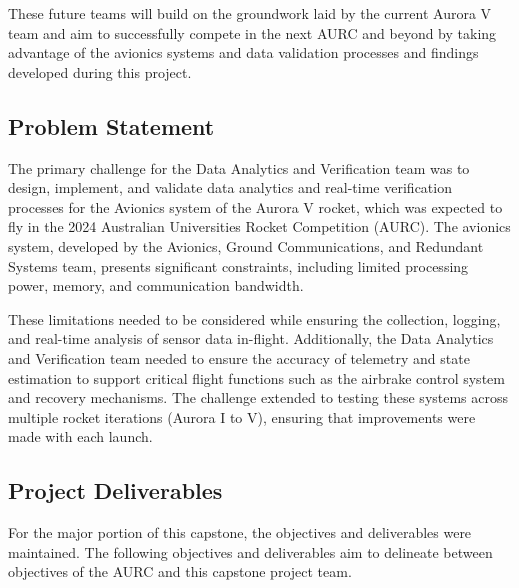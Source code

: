 These future teams will build on the groundwork laid by the current Aurora V team and aim to successfully compete in the next AURC and beyond by taking advantage of the avionics systems and data validation processes and findings developed during this project. 

\subsection{Problem Statement}
The primary challenge for the Data Analytics and Verification team was to design, implement, and validate data analytics and real-time verification processes for the Avionics system of the Aurora V rocket, which was expected to fly in the 2024 Australian Universities Rocket Competition (AURC). The avionics system, developed by the Avionics, Ground Communications, and Redundant Systems team, presents significant constraints, including limited processing power, memory, and communication bandwidth.

These limitations needed to be considered while ensuring the collection, logging, and real-time analysis of sensor data in-flight. Additionally, the Data Analytics and Verification team needed to ensure the accuracy of telemetry and state estimation to support critical flight functions such as the airbrake control system and recovery mechanisms. The challenge extended to testing these systems across multiple rocket iterations (Aurora I to V), ensuring that improvements were made with each launch.

\subsection{Project Deliverables}
For the major portion of this capstone, the objectives and deliverables were maintained. The following objectives and deliverables aim to delineate between objectives of the AURC and this capstone project team.

